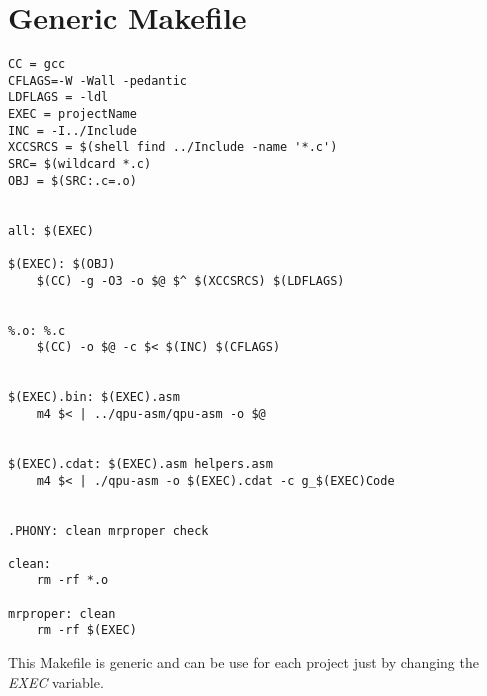 
\chapter{Generic Makefile} %

\label{AppendixF} %


\begin{lstlisting}
CC = gcc
CFLAGS=-W -Wall -pedantic
LDFLAGS = -ldl
EXEC = projectName
INC = -I../Include
XCCSRCS = $(shell find ../Include -name '*.c')
SRC= $(wildcard *.c)
OBJ = $(SRC:.c=.o)


all: $(EXEC)

$(EXEC): $(OBJ)
	$(CC) -g -O3 -o $@ $^ $(XCCSRCS) $(LDFLAGS)


%.o: %.c
	$(CC) -o $@ -c $< $(INC) $(CFLAGS)


$(EXEC).bin: $(EXEC).asm
	m4 $< | ../qpu-asm/qpu-asm -o $@


$(EXEC).cdat: $(EXEC).asm helpers.asm
	m4 $< | ./qpu-asm -o $(EXEC).cdat -c g_$(EXEC)Code


.PHONY: clean mrproper check

clean:
	rm -rf *.o

mrproper: clean
	rm -rf $(EXEC)
\end{lstlisting}


This Makefile is generic and can be use for each project just by changing the \emph{EXEC} variable.

